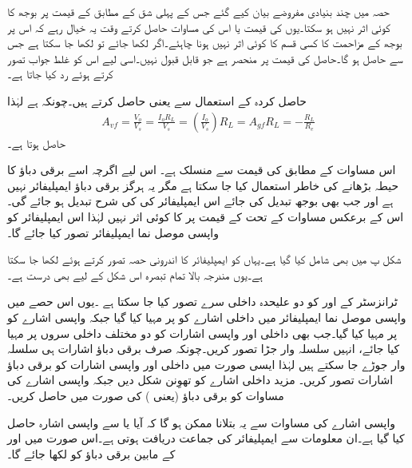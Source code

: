 حصہ  میں چند بنیادی مفروضے بیان کیے گئے جس کے پہلی شق کے مطابق  کے قیمت پر بوجھ  کا کوئی اثر نہیں ہو سکتا۔یوں  کی قیمت یا اس کی مساوات حاصل کرتے وقت یہ خیال رہے کہ اس پر بوجھ کے مزاحمت  کا کسی قسم کا کوئی اثر نہیں ہونا چاہئے۔اگر  لکھا جائے تو  لکھا جا سکتا ہے جس سے  حاصل ہو گا۔حاصل  کی قیمت  پر منحصر ہے جو قابل قبول نہیں۔اسی لیے اس کو غلط جواب تصور کرتے ہوئے رد کیا جاتا ہے۔

حاصل کردہ  کے استعمال سے  یعنی  حاصل کرتے ہیں۔چونکہ  ہے لہٰذا
\begin{align}
A_{vf}=\frac{V_o}{V_s}=\frac{I_o R_L}{V_s}=\left(\frac{I_o}{V_s} \right ) R_L=A_{gf} R_L=-\frac{R_L}{R_e}
\end{align}
حاصل ہوتا ہے۔

اس مساوات کے مطابق  کی قیمت  سے منسلک ہے۔ اس لیے اگرچہ اسے برقی دباؤ کا حیطہ بڑھانے کی خاطر استعمال کیا جا سکتا ہے مگر یہ ہرگز برقی دباؤ ایمپلیفائر نہیں ہے اور جب بھی بوجھ  تبدیل کی جائے اس ایمپلیفائر کی  کی شرح تبدیل ہو جائے گی۔اس کے برعکس مساوات  کے تحت  کے قیمت پر  کا کوئی اثر نہیں لہٰذا اس ایمپلیفائر کو واپسی موصل نما ایمپلیفائر تصور کیا جائے گا۔

شکل  پ میں  بھی شامل کیا گیا ہے۔یہاں  کو ایمپلیفائر کا اندرونی حصہ تصور کرتے ہوئے  لکھا جا سکتا ہے۔یوں مندرجہ بالا تمام تبصرہ اس شکل کے لیے بھی درست ہے۔

ٹرانزسٹر کے  اور  کو دو علیحدہ داخلی سرے تصور کیا جا سکتا ہے ۔یوں اس حصے میں واپسی موصل نما ایمپلیفائر میں داخلی اشارے  کو  پر مہیا کیا گیا جبکہ واپسی اشارے کو  پر مہیا کیا گیا۔جب بھی داخلی اور واپسی اشارات کو دو مختلف داخلی سروں پر مہیا کیا جائے، انہیں سلسلہ وار جڑا تصور کریں۔چونکہ صرف برقی دباؤ اشارات ہی سلسلہ وار جوڑے جا سکتے ہیں لہٰذا ایسی صورت میں داخلی اور واپسی اشارات کو برقی دباؤ  اشارات تصور کریں۔ مزید داخلی اشارے کو تھوِنن  شکل دیں جبکہ واپسی اشارے کی مساوات کو برقی دباؤ (یعنی ) کی صورت میں حاصل کریں۔

واپسی اشارے کی مساوات سے یہ بتلانا ممکن ہو گا کہ آیا  یا  سے واپسی اشارہ حاصل کیا گیا ہے۔ان معلومات سے ایمپلیفائر کی جماعت دریافت ہوتی ہے۔اس صورت میں  اور  کے مابین برقی دباؤ کو  لکھا جائے گا۔



